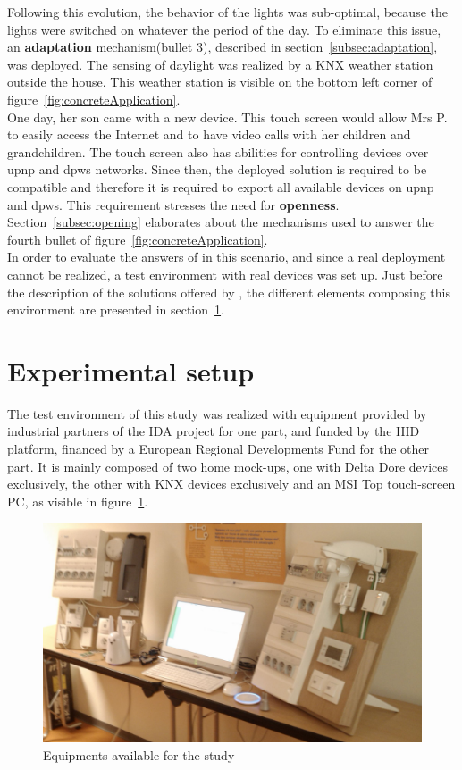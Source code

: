 Following this evolution, the behavior of the lights was sub-optimal, because the lights were switched on whatever the period of the day. To eliminate this issue, an {\bf adaptation} mechanism(bullet 3), described in section~\ref{subsec:adaptation}, was deployed. The sensing of daylight was realized by a KNX weather station outside the house. This weather station is visible on the bottom left corner of figure~\ref{fig:concreteApplication}.\\

One day, her son came with a new device. This touch screen would allow Mrs P. to easily access the Internet and to have video calls with her children and grandchildren. The touch screen also has abilities for controlling devices over \gls{upnp} and \gls{dpws} networks. Since then, the deployed solution is required to be compatible and therefore it is required to export all available devices on \gls{upnp} and \gls{dpws}. This requirement stresses the need for {\bf openness}. Section~\ref{subsec:opening} elaborates about the mechanisms used to answer the fourth bullet of figure~\ref{fig:concreteApplication}.\\


In order to evaluate the answers of \enti{} in this scenario, and since a real deployment cannot be realized, a test environment with real devices was set up. Just before the description of the solutions offered by \enti{}, the different elements composing this environment are presented in section~\ref{sect:envDeTest}.


\section{Experimental setup}
\label{sect:envDeTest}
The test environment of this study was realized with equipment provided by industrial partners of the IDA project for one part, and funded by the HID platform, financed by a European Regional Developments Fund for the other part. It is mainly composed of two home mock-ups, one with Delta Dore devices exclusively, the other with KNX devices exclusively and an MSI Top touch-screen PC, as visible in figure~\ref{fig:equimentsForTheStudy}.

\begin{figure}[h!]
\includegraphics[width=\textwidth]{part4/pics/maquettes.jpg}
\caption{Equipments available for the study}
\label{fig:equimentsForTheStudy}
\end{figure}


